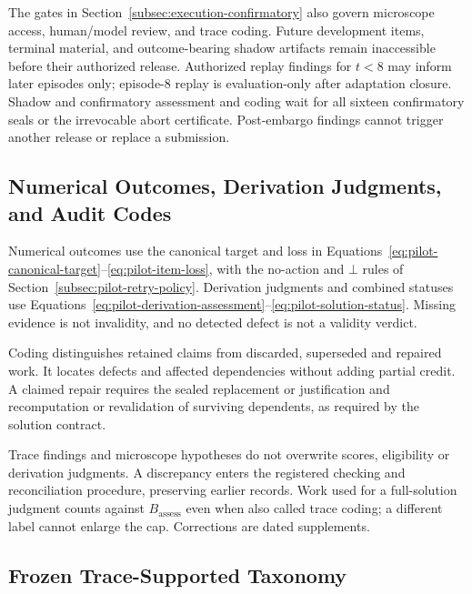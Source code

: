 \documentclass[10pt]{article} %
\providecommand{\1}{\mathbf{1}}  %
\theoremstyle{remark}
\theoremstyle{definition}
\begin{document}
The gates in Section~\ref{subsec:execution-confirmatory} also govern microscope
access, human/model review, and trace coding. Future development items,
terminal material, and outcome-bearing shadow artifacts remain inaccessible
before their authorized release. Authorized replay findings for $t<8$ may
inform later episodes only; episode-8 replay is evaluation-only after
adaptation closure. Shadow and confirmatory assessment and coding wait for
all sixteen confirmatory seals or the irrevocable abort certificate.
Post-embargo findings cannot trigger another release or replace a submission.

\subsection{Numerical Outcomes, Derivation Judgments, and Audit Codes}
\label{subsec:audit-endpoints}

Numerical outcomes use the canonical target and loss in
Equations~\ref{eq:pilot-canonical-target}--\ref{eq:pilot-item-loss}, with the
no-action and $\bot$ rules of Section~\ref{subsec:pilot-retry-policy}.
Derivation judgments and combined statuses use
Equations~\ref{eq:pilot-derivation-assessment}--\ref{eq:pilot-solution-status}.
Missing evidence is not invalidity, and no detected defect is not a validity
verdict.

Coding distinguishes retained claims from discarded, superseded and repaired
work. It locates defects and affected dependencies without adding partial
credit. A claimed repair requires the sealed replacement or justification
and recomputation or revalidation of surviving dependents, as required by
the solution contract.

Trace findings and microscope hypotheses do not overwrite scores,
eligibility or derivation judgments. A discrepancy enters the registered
checking and reconciliation procedure, preserving earlier records. Work
used for a full-solution judgment counts against $B_{\mathrm{assess}}$ even
when also called trace coding; a different label cannot enlarge the cap.
Corrections are dated supplements.

\subsection{Frozen Trace-Supported Taxonomy}
\label{subsec:audit-taxonomy}
\end{document}
